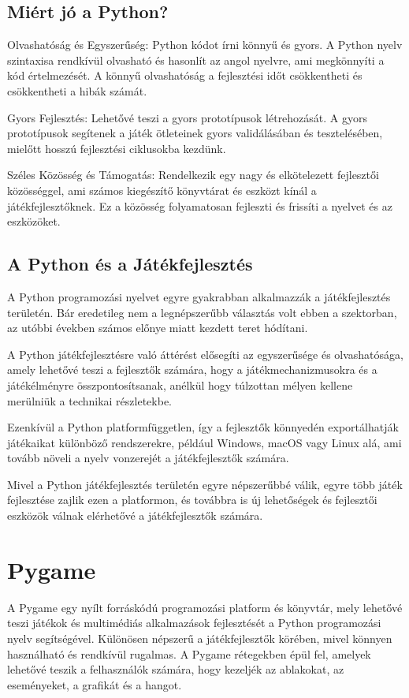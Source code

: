 \subsection{Miért jó a Python?}\cite{why-is-python}
\indent \indent Olvashatóság és Egyszerűség:
Python kódot írni könnyű és gyors. A Python nyelv szintaxisa rendkívül olvasható és hasonlít az angol nyelvre, ami megkönnyíti a kód értelmezését. A könnyű olvashatóság a fejlesztési időt csökkentheti és csökkentheti a hibák számát.

Gyors Fejlesztés:
Lehetővé teszi a gyors prototípusok létrehozását. A gyors prototípusok segítenek a játék ötleteinek gyors validálásában és tesztelésében, mielőtt hosszú fejlesztési ciklusokba kezdünk.

Széles Közösség és Támogatás:
Rendelkezik egy nagy és elkötelezett fejlesztői közösséggel, ami számos kiegészítő könyvtárat és eszközt kínál a játékfejlesztőknek. Ez a közösség folyamatosan fejleszti és frissíti a nyelvet és az eszközöket.


\subsection{A Python és a Játékfejlesztés}\cite{python-in-game-dev}
\indent \indent A Python programozási nyelvet egyre gyakrabban alkalmazzák a játékfejlesztés területén. Bár eredetileg nem a legnépszerűbb választás volt ebben a szektorban, az utóbbi években számos előnye miatt kezdett teret hódítani.

A Python játékfejlesztésre való áttérést elősegíti az egyszerűsége és olvashatósága, amely lehetővé teszi a fejlesztők számára, hogy a játékmechanizmusokra és a játékélményre összpontosítsanak, anélkül hogy túlzottan mélyen kellene merülniük a technikai részletekbe.

Ezenkívül a Python platformfüggetlen, így a fejlesztők könnyedén exportálhatják játékaikat különböző rendszerekre, például Windows, macOS vagy Linux alá, ami tovább növeli a nyelv vonzerejét a játékfejlesztők számára.

Mivel a Python játékfejlesztés területén egyre népszerűbbé válik, egyre több játék fejlesztése zajlik ezen a platformon, és továbbra is új lehetőségek és fejlesztői eszközök válnak elérhetővé a játékfejlesztők számára.

\section{Pygame}\cite{pygame}
\indent \indent A Pygame egy nyílt forráskódú programozási platform és könyvtár, mely lehetővé teszi játékok és multimédiás alkalmazások fejlesztését a Python programozási nyelv segítségével. Különösen népszerű a játékfejlesztők körében, mivel könnyen használható és rendkívül rugalmas. A Pygame rétegekben épül fel, amelyek lehetővé teszik a felhasználók számára, hogy kezeljék az ablakokat, az eseményeket, a grafikát és a hangot.
